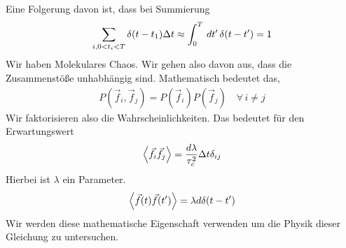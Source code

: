 \begin{description}
Eine Folgerung davon ist, dass bei Summierung
%
\begin{align*}
  \sum_{i, 0 < t_i < T}^{} \delta(t - t_1) \Delta t \approx \int_{0}^{T} \,dt'\, \delta(t- t') = 1
\end{align*}
%
Wir haben Molekulares Chaos. Wir gehen also davon aus, dass die Zusammenstöße unhabhängig sind.
Mathematisch bedeutet das,
%
\begin{align*}
  P(\vec{f}_i, \vec{f}_j) = P(\vec{f}_i) P(\vec{f}_j) \quad\forall\, i \neq j
\end{align*}
%
Wir faktorisieren also die Wahrscheinlichkeiten.
Das bedeutet für den Erwartungswert
%
\begin{align*}
  \Braket{\vec{f}_i \vec{f}_j} = \frac{d \lambda}{\tau_c^2} \Delta t \delta_{ij}
\end{align*}
%
Hierbei ist $\lambda$ ein Parameter.
%
\begin{align*}
  \Braket{\vec{f}(t)\vec{f}(t')} = \lambda d \delta(t - t')
\end{align*}
%
Wir werden diese mathematische Eigenschaft verwenden um die Physik dieser
Gleichung zu untersuchen.


\end{description}
